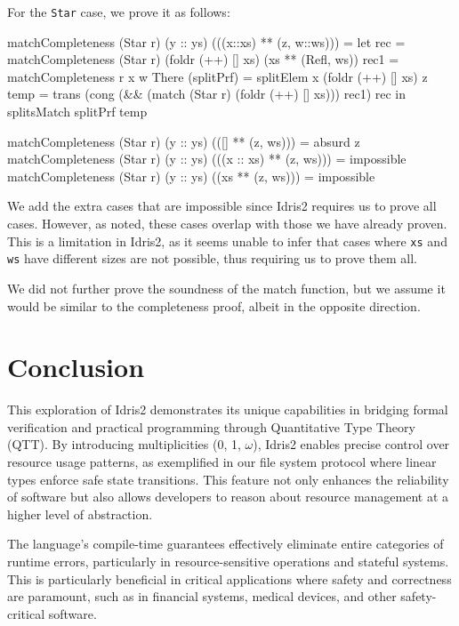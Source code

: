 \documentclass[]{rptuseminar}
\begin{document}
For the \texttt{Star} case, we prove it as follows:

\begin{idris}
matchCompleteness (Star r) (y :: ys) (((x::xs) ** (z, w::ws))) = 
    let rec = matchCompleteness (Star r) (foldr (++) [] xs) (xs ** (Refl, ws))
        rec1 = matchCompleteness r x w
        There (splitPrf) = splitElem x (foldr (++) [] xs) z
        temp = trans (cong (&& (match (Star r) (foldr (++) [] xs))) rec1) rec
    in splitsMatch splitPrf temp 

matchCompleteness (Star r) (y :: ys) (([] ** (z, ws))) = absurd z
matchCompleteness (Star r) (y :: ys) (((x :: xs) ** (z, ws))) = impossible
matchCompleteness (Star r) (y :: ys) ((xs ** (z, ws))) = impossible
\end{idris}

We add the extra cases that are impossible since Idris2 requires us to prove all cases. However, as noted, these cases overlap with those we have already proven. This is a limitation in Idris2, as it seems unable to infer that cases where \texttt{xs} and \texttt{ws} have different sizes are not possible, thus requiring us to prove them all.

We did not further prove the soundness of the match function, but we assume it would be similar to the completeness proof, albeit in the opposite direction.

\section{Conclusion}  
\label{sec:conclusion}  

This exploration of Idris2 demonstrates its unique capabilities in bridging formal verification and practical programming through Quantitative Type Theory (QTT). By introducing multiplicities (0, 1, \(\omega\)), Idris2 enables precise control over resource usage patterns, as exemplified in our file system protocol where linear types enforce safe state transitions. This feature not only enhances the reliability of software but also allows developers to reason about resource management at a higher level of abstraction.

The language's compile-time guarantees effectively eliminate entire categories of runtime errors, particularly in resource-sensitive operations and stateful systems. This is particularly beneficial in critical applications where safety and correctness are paramount, such as in financial systems, medical devices, and other safety-critical software.
\end{document}
